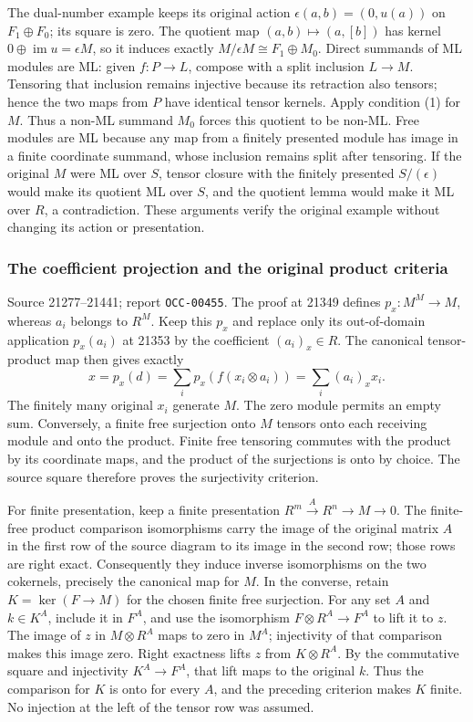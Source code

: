 The dual-number example keeps its original action \(\epsilon(a,b)=(0,u(a))\) on \(F_1\oplus F_0\); its square is zero. The quotient map \((a,b)\mapsto(a,[b])\) has kernel \(0\oplus\operatorname{im}u=\epsilon M\), so it induces exactly \(M/\epsilon M\cong F_1\oplus M_0\). Direct summands of ML modules are ML: given \(f:P\to L\), compose with a split inclusion \(L\to M\). Tensoring that inclusion remains injective because its retraction also tensors; hence the two maps from \(P\) have identical tensor kernels. Apply condition (1) for \(M\). Thus a non-ML summand \(M_0\) forces this quotient to be non-ML. Free modules are ML because any map from a finitely presented module has image in a finite coordinate summand, whose inclusion remains split after tensoring. If the original \(M\) were ML over \(S\), tensor closure with the finitely presented \(S/(\epsilon)\) would make its quotient ML over \(S\), and the quotient lemma would make it ML over \(R\), a contradiction. These arguments verify the original example without changing its action or presentation.

\subsubsection{The coefficient projection and the original product criteria}\label{the-coefficient-projection-and-the-original-product-criteria}

Source 21277--21441; report \texttt{OCC-00455}. The proof at 21349 defines \(p_x:M^M\to M\), whereas \(a_i\) belongs to \(R^M\). Keep this \(p_x\) and replace only its out-of-domain application \(p_x(a_i)\) at 21353 by the coefficient \((a_i)_x\in R\). The canonical tensor-product map then gives exactly \[
x=p_x(d)=\sum_i p_x(f(x_i\otimes a_i))=\sum_i(a_i)_x x_i.
\] The finitely many original \(x_i\) generate \(M\). The zero module permits an empty sum. Conversely, a finite free surjection onto \(M\) tensors onto each receiving module and onto the product. Finite free tensoring commutes with the product by its coordinate maps, and the product of the surjections is onto by choice. The source square therefore proves the surjectivity criterion.

For finite presentation, keep a finite presentation \(R^m\xrightarrow{A}R^n\to M\to0\). The finite-free product comparison isomorphisms carry the image of the original matrix \(A\) in the first row of the source diagram to its image in the second row; those rows are right exact. Consequently they induce inverse isomorphisms on the two cokernels, precisely the canonical map for \(M\). In the converse, retain \(K=\ker(F\to M)\) for the chosen finite free surjection. For any set \(A\) and \(k\in K^A\), include it in \(F^A\), and use the isomorphism \(F\otimes R^A\to F^A\) to lift it to \(z\). The image of \(z\) in \(M\otimes R^A\) maps to zero in \(M^A\); injectivity of that comparison makes this image zero. Right exactness lifts \(z\) from \(K\otimes R^A\). By the commutative square and injectivity \(K^A\to F^A\), that lift maps to the original \(k\). Thus the comparison for \(K\) is onto for every \(A\), and the preceding criterion makes \(K\) finite. No injection at the left of the tensor row was assumed.

